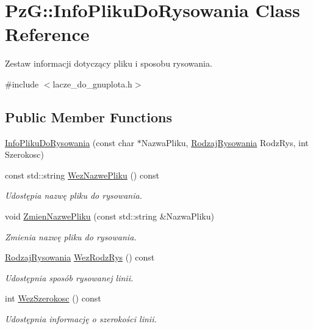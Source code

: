 \hypertarget{classPzG_1_1InfoPlikuDoRysowania}{}\section{PzG\+:\+:Info\+Pliku\+Do\+Rysowania Class Reference}
\label{classPzG_1_1InfoPlikuDoRysowania}


Zestaw informacji dotyczący pliku i sposobu rysowania.  




{\ttfamily \#include $<$lacze\+\_\+do\+\_\+gnuplota.\+h$>$}

\subsection*{Public Member Functions}
\begin{DoxyCompactItemize}
\item 
\hyperlink{classPzG_1_1InfoPlikuDoRysowania_a48bc8ad94ef5fd5120b668a566c9172e}{Info\+Pliku\+Do\+Rysowania} (const char $\ast$Nazwa\+Pliku, \hyperlink{namespacePzG_a705c92106f39b7d0c34a6739d10ff0b6}{Rodzaj\+Rysowania} Rodz\+Rys, int Szerokosc)
\item 
const std\+::string \hyperlink{classPzG_1_1InfoPlikuDoRysowania_ac92a5dc258f9b6164631e2ea5247a7a7}{Wez\+Nazwe\+Pliku} () const
\begin{DoxyCompactList}\small\item\em Udostępia nazwę pliku do rysowania. \end{DoxyCompactList}\item 
void \hyperlink{classPzG_1_1InfoPlikuDoRysowania_ae734c69f5cecf9c0584e3a7f433340ea}{Zmien\+Nazwe\+Pliku} (const std\+::string \&Nazwa\+Pliku)
\begin{DoxyCompactList}\small\item\em Zmienia nazwę pliku do rysowania. \end{DoxyCompactList}\item 
\hyperlink{namespacePzG_a705c92106f39b7d0c34a6739d10ff0b6}{Rodzaj\+Rysowania} \hyperlink{classPzG_1_1InfoPlikuDoRysowania_a6a46f3c7b7a08dfa9d694f387f873234}{Wez\+Rodz\+Rys} () const
\begin{DoxyCompactList}\small\item\em Udostępnia sposób rysowanej linii. \end{DoxyCompactList}\item 
int \hyperlink{classPzG_1_1InfoPlikuDoRysowania_a627bb615c50f3b03374774e6b974488b}{Wez\+Szerokosc} () const
\begin{DoxyCompactList}\small\item\em Udostępnia informację o szerokości linii. \end{DoxyCompactList}\end{DoxyCompactItemize}
